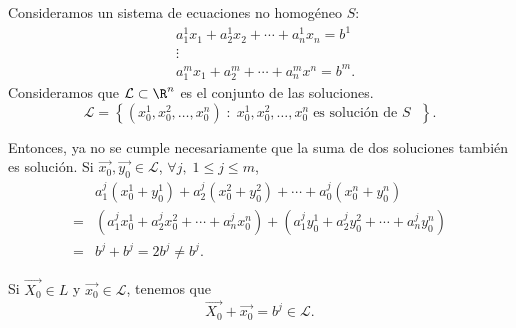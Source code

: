 Consideramos un sistema de ecuaciones no homogéneo $\displaystyle S $:
\[
\begin{split}
& a_{1}^{1}x_{1}+a_{2}^{1}x_{2}+\cdots+a_{n}^{1}x_{n}=b^{1} \\
& \vdots \\
& a^{m}_{1}x_{1}+a^{m}_{2}+\cdots+a^{m}_{n}x^{n}=b^{m}. 
\end{split}
\]
Consideramos que $\displaystyle \mathcal{L}\subset \R^{n} $ es el conjunto de las soluciones. 
\[\mathcal{L} = \left\{ \left(x^{1}_{0}, x^{2}_{0}, \ldots, x^{n}_{0}\right)\; : \; x^{1}_{0}, x^{2}_{0}, \ldots, x^{n}_{0}\; \text{es solución de $\displaystyle S $ }\right\}  .\]

Entonces, ya no se cumple necesariamente que la suma de dos soluciones también es solución. Si $\displaystyle \vec{x_{0}}, \vec{y_{0}}\in\mathcal{L} $, $\displaystyle \forall j, \; 1\leq j \leq m$, 
\[
\begin{split}
&a^{j}_{1}\left(x^{1}_{0}+y^{1}_{0}\right) + a^{j}_{2}\left(x^{2}_{0}+y^{2}_{0}\right)+\cdots + a^{j}_{0}\left(x^{n}_{0}+y^{n}_{0}\right)\\
= & \left(a^{j}_{1}x^{1}_{0}+a^{j}_{2}x^{2}_{0}+\cdots+a^{j}_{n}x^{n}_{0}\right) + \left(a^{j}_{1}y^{1}_{0}+a^{j}_{2}y^{2}_{0}+\cdots+a^{j}_{n}y^{n}_{0}\right) \\
= & b^{j}+b^{j} = 2 b^{j} \neq b^{j}.
\end{split}
\]

Si $\displaystyle \vec{X_{0}}\in L $ y $\displaystyle \vec{x_{0}}\in\mathcal{L} $, tenemos que 
\[\vec{X_{0}}+\vec{x_{0}} = b^{j}\in\mathcal{L} .\]

